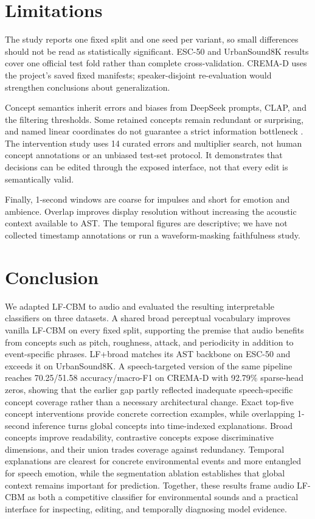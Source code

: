 \documentclass[10pt]{article}
\begin{document}
\section{Limitations}
The study reports one fixed split and one seed per variant, so small differences should not be read as statistically significant. ESC-50 and UrbanSound8K results cover one official test fold rather than complete cross-validation. CREMA-D uses the project's saved fixed manifests; speaker-disjoint re-evaluation would strengthen conclusions about generalization.

Concept semantics inherit errors and biases from DeepSeek prompts, CLAP, and the filtering thresholds. Some retained concepts remain redundant or surprising, and named linear coordinates do not guarantee a strict information bottleneck \citep{almudevar2025bottleneck}. The intervention study uses 14 curated errors and multiplier search, not human concept annotations or an unbiased test-set protocol. It demonstrates that decisions can be edited through the exposed interface, not that every edit is semantically valid.

Finally, 1-second windows are coarse for impulses and short for emotion and ambience. Overlap improves display resolution without increasing the acoustic context available to AST. The temporal figures are descriptive; we have not collected timestamp annotations or run a waveform-masking faithfulness study.

\section{Conclusion}
We adapted LF-CBM to audio and evaluated the resulting interpretable classifiers on three datasets. A shared broad perceptual vocabulary improves vanilla LF-CBM on every fixed split, supporting the premise that audio benefits from concepts such as pitch, roughness, attack, and periodicity in addition to event-specific phrases. LF+broad matches its AST backbone on ESC-50 and exceeds it on UrbanSound8K. A speech-targeted version of the same pipeline reaches 70.25/51.58 accuracy/macro-F1 on CREMA-D with 92.79\% sparse-head zeros, showing that the earlier gap partly reflected inadequate speech-specific concept coverage rather than a necessary architectural change. Exact top-five concept interventions provide concrete correction examples, while overlapping 1-second inference turns global concepts into time-indexed explanations. Broad concepts improve readability, contrastive concepts expose discriminative dimensions, and their union trades coverage against redundancy. Temporal explanations are clearest for concrete environmental events and more entangled for speech emotion, while the segmentation ablation establishes that global context remains important for prediction. Together, these results frame audio LF-CBM as both a competitive classifier for environmental sounds and a practical interface for inspecting, editing, and temporally diagnosing model evidence.
\end{document}
